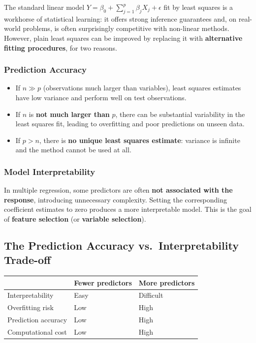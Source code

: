 \documentclass[11pt,a4paper]{article}
\theoremstyle{definition}
\theoremstyle{plain}
\theoremstyle{remark}
\begin{document}
The standard linear model $Y = \beta_0 + \sum_{j=1}^p \beta_j X_j + \epsilon$ fit by least squares is a workhorse of statistical learning: it offers strong inference guarantees and, on real-world problems, is often surprisingly competitive with non-linear methods. However, plain least squares can be improved by replacing it with \textbf{alternative fitting procedures}, for two reasons.

\subsubsection{Prediction Accuracy}

\begin{itemize}
    \item If $n \gg p$ (observations much larger than variables), least squares estimates have low variance and perform well on test observations.
    \item If $n$ is \textbf{not much larger than} $p$, there can be substantial variability in the least squares fit, leading to overfitting and poor predictions on unseen data.
    \item If $p > n$, there is \textbf{no unique least squares estimate}: variance is infinite and the method cannot be used at all.
\end{itemize}

\subsubsection{Model Interpretability}

In multiple regression, some predictors are often \textbf{not associated with the response}, introducing unnecessary complexity. Setting the corresponding coefficient estimates to zero produces a more interpretable model. This is the goal of \textbf{feature selection} (or \textbf{variable selection}).

\subsection{The Prediction Accuracy vs.\ Interpretability Trade-off}

\begin{center}
\begin{tabular}{lll}
 & \textbf{Fewer predictors} & \textbf{More predictors} \\
\hline
Interpretability & Easy & Difficult \\
Overfitting risk & Low & High \\
Prediction accuracy & Low & High \\
Computational cost & Low & High \\
\end{tabular}
\end{center}
\end{document}
